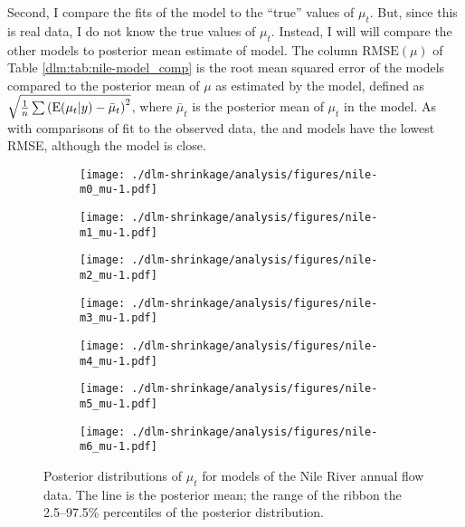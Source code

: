 Second, I compare the fits of the model to the ``true'' values of $\mu_{t}$. 
But, since this is real data, I do not know the true values of $\mu_{t}$.
Instead, I will will compare the other models to posterior mean estimate of  model. 
The column $\textrm{RMSE}(\mu)$ of Table \ref{dlm:tab:nile-model_comp} is the root mean squared error of the models compared to the posterior mean of $\mu$ as estimated by the  model, defined as $\sqrt{\frac{1}{n} \sum {(\operatorname{E}(\mu_{t}| y) - \bar{\mu}_{t})}^{2}}$, where $\bar{\mu}_{t}$ is the posterior mean of $\mu_{t}$ in the  model.
As with comparisons of fit to the observed data, the  and  models have the lowest RMSE, although the  model is close.


\begin{figure}[htpb!]
  \centering
  \begin{subfigure}[b]{0.5\linewidth}
    \texttt{[image: ./dlm-shrinkage/analysis/figures/nile-m0\_mu-1.pdf]}
    \caption{}
  \end{subfigure}%
  \begin{subfigure}[b]{0.5\linewidth}
    \texttt{[image: ./dlm-shrinkage/analysis/figures/nile-m1\_mu-1.pdf]}
    \caption{}
  \end{subfigure}
  \begin{subfigure}[b]{0.5\linewidth}
    \texttt{[image: ./dlm-shrinkage/analysis/figures/nile-m2\_mu-1.pdf]}    
    \caption{}
  \end{subfigure}%
  \begin{subfigure}[b]{0.5\linewidth}
    \texttt{[image: ./dlm-shrinkage/analysis/figures/nile-m3\_mu-1.pdf]}
    \caption{}
  \end{subfigure}
  \begin{subfigure}[b]{0.5\linewidth}
    \texttt{[image: ./dlm-shrinkage/analysis/figures/nile-m4\_mu-1.pdf]}    
    \caption{}
  \end{subfigure}%
  \begin{subfigure}[b]{0.5\linewidth}
    \texttt{[image: ./dlm-shrinkage/analysis/figures/nile-m5\_mu-1.pdf]}
    \caption{}
  \end{subfigure}
  \begin{subfigure}[b]{0.5\linewidth}
    \texttt{[image: ./dlm-shrinkage/analysis/figures/nile-m6\_mu-1.pdf]}    
    \caption{}
  \end{subfigure}
  \caption[Posterior distributions of $\mu_t$ for models of the Nile River annual flow data.]{Posterior distributions of $\mu_t$ for models of the Nile River annual flow data. The line is the posterior mean; the range of the ribbon the 2.5--97.5\% percentiles of the posterior distribution.}
  \label{dlm:fig:nile_mu_posterior}
\end{figure}


